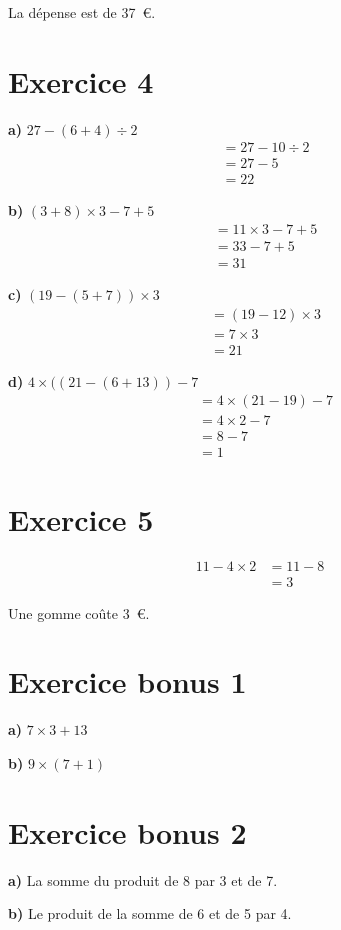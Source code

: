 \documentclass[12pt]{extarticle}
\begin{document}
La dépense est de 37~€.

\section*{Exercice 4}

\textbf{a)} $27 - (6 + 4) \div 2$
\begin{align*}
&= 27 - 10 \div 2 \\
&= 27 - 5 \\
&= 22
\end{align*}

\textbf{b)} $(3 + 8) \times 3 - 7 + 5$
\begin{align*}
&= 11 \times 3 - 7 + 5 \\
&= 33 - 7 + 5 \\
&= 31
\end{align*}

\textbf{c)} $(19 - (5 + 7)) \times 3$
\begin{align*}
&= (19 - 12) \times 3 \\
&= 7 \times 3 \\
&= 21
\end{align*}

\textbf{d)} $4 \times ((21 - (6 + 13)) - 7$
\begin{align*}
&= 4 \times (21 - 19) - 7 \\
&= 4 \times 2 - 7 \\
&= 8 - 7 \\
&= 1
\end{align*}

\section*{Exercice 5}
\begin{align*}
11 - 4 \times 2 &= 11 - 8 \\
                &= 3
\end{align*}

Une gomme coûte 3~€.

\section*{Exercice bonus 1}

\textbf{a)} $7 \times 3 + 13$

\textbf{b)} $9 \times (7 + 1)$

\section*{Exercice bonus 2}

\textbf{a)} La somme du produit de 8 par 3 et de 7.

\textbf{b)} Le produit de la somme de 6 et de 5 par 4.
\end{document}
